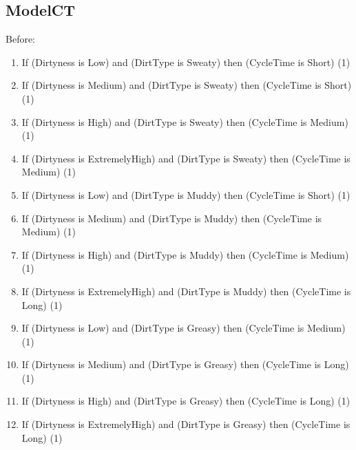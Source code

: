\documentclass[11pt]{article}
\begin{document}
\begin{enumerate}[label=(\alph*)]
  \subsection*{ModelCT}

  Before:
  \begin{enumerate}[label=(\arabic*)]
  \item If (Dirtyness is Low) and (DirtType is Sweaty) then (CycleTime is Short) (1)
  \item If (Dirtyness is Medium) and (DirtType is Sweaty) then (CycleTime is Short) (1)
  \item If (Dirtyness is High) and (DirtType is Sweaty) then (CycleTime is Medium) (1)
  \item If (Dirtyness is ExtremelyHigh) and (DirtType is Sweaty) then (CycleTime is Medium) (1)
  \item If (Dirtyness is Low) and (DirtType is Muddy) then (CycleTime is Short) (1)
  \item If (Dirtyness is Medium) and (DirtType is Muddy) then (CycleTime is Medium) (1)
  \item If (Dirtyness is High) and (DirtType is Muddy) then (CycleTime is Medium) (1)
  \item If (Dirtyness is ExtremelyHigh) and (DirtType is Muddy) then (CycleTime is Long) (1)
  \item If (Dirtyness is Low) and (DirtType is Greasy) then (CycleTime is Medium) (1)
  \item If (Dirtyness is Medium) and (DirtType is Greasy) then (CycleTime is Long) (1)
  \item If (Dirtyness is High) and (DirtType is Greasy) then (CycleTime is Long) (1)
  \item If (Dirtyness is ExtremelyHigh) and (DirtType is Greasy) then (CycleTime is Long) (1)
  \end{enumerate}


\end{enumerate}
\end{document}
